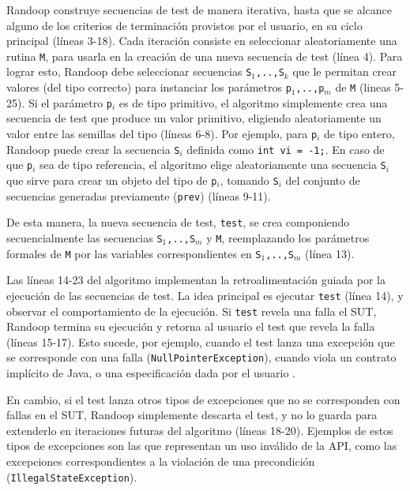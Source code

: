 \textsf{Randoop} construye secuencias de test de manera
iterativa, hasta que se alcance alguno de los criterios de terminación
provistos por el usuario, en su ciclo principal (líneas 3-18). 
Cada iteración consiste en seleccionar aleatoriamente una rutina \texttt{M},
para usarla en la creación de una nueva secuencia de test (línea 4). 
Para lograr esto, \textsf{Randoop} debe seleccionar secuencias \texttt{S$_1$,..,S$_k$}
que le permitan crear valores (del tipo correcto) para instanciar los parámetros 
\texttt{p$_1$,..,p$_m$} de \texttt{M} (lineas 5-25). 
Si el parámetro \texttt{p$_i$} es de tipo primitivo, el algoritmo simplemente
crea una secuencia de test que produce un valor primitivo, eligiendo
aleatoriamente un valor entre las semillas del tipo (líneas 6-8). 
Por ejemplo, para \texttt{p$_i$} de tipo entero, 
\textsf{Randoop} puede crear la secuencia \texttt{S$_i$} definida como 
\texttt{int vi = -1;}.
En caso de que \texttt{p$_i$} sea de tipo referencia, el algoritmo elige
aleatoriamente una secuencia \texttt{S$_i$} que sirve para crear un objeto del
tipo de \texttt{p$_i$}, tomando \texttt{S$_i$} del conjunto de secuencias generadas 
previamente (\texttt{prev}) (líneas 9-11).

De esta manera, la nueva secuencia de test, \texttt{test}, se crea componiendo
secuencialmente las secuencias \texttt{S$_1$,..,S$_m$} y \texttt{M},
reemplazando los parámetros formales de \texttt{M} por las variables
correspondientes en \texttt{S$_1$,..,S$_m$} (línea 13). 

Las líneas 14-23 del algoritmo implementan la retroalimentación guiada por la ejecución
de las secuencias de test. La idea principal es ejecutar \texttt{test} (línea
14), y observar el comportamiento de la ejecución. Si \texttt{test} revela una
falla el SUT, \textsf{Randoop} termina su ejecución y retorna al usuario el test que
revela la falla (líneas 15-17). Esto sucede, por ejemplo, cuando el test lanza una excepción 
que se corresponde con una falla (\texttt{NullPointerException}), cuando viola un contrato implícito 
de Java, o una especificación dada por el usuario \cite{Pacheco07}.

En cambio, si el test lanza otros tipos de excepciones que no se corresponden
con fallas en el SUT, \textsf{Randoop} simplemente descarta el test, y no lo guarda para
extenderlo en iteraciones futuras del algoritmo (líneas 18-20). Ejemplos de
estos tipos de excepciones son las que representan un uso inválido de la API,
como las excepciones correspondientes a la violación de una
precondición (\texttt{IllegalStateException}).

